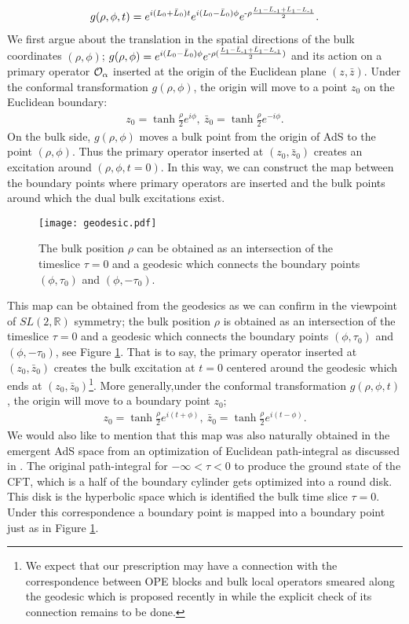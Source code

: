 \documentclass[11pt,a4paper]{article}
\def\a{{\alpha}}
\def\CO{{\cal O}}
\def\ba{\begin{eqnarray}}
\def\ea{\end{eqnarray}}
\def\f {\frac}
\def\z{\bar{z}}
\begin{document}
\ba
g(\rho,\phi,t)=%
e^{i(L_0+\bar{L}_0)t}e^{i(L_0-\bar{L}_0)\phi}e^{\mathchar`-
\rho\frac{L_{1}-\bar{L}_{\mathchar`-1}+\bar{L}_{1}-L_{\mathchar`-1}}{2}}.
\label{slgl}
\ea
We first argue about the translation in the spatial directions of the bulk coordinates $(\rho,\phi)$; $g(\rho,\phi)=%
e^{i(L_0-\bar{L}_0)\phi}e^{\mathchar`-
\rho(\frac{L_{1}-\bar{L}_{\mathchar`-1}+\bar{L}_{1}-L_{\mathchar`-1}}{2})}$ and its action on a primary operator $\CO_\a$ inserted at the origin of the Euclidean plane $(z,\z)$.
Under the conformal transformation $g(\rho,\phi)$, the origin will move to a point $z_0$ on the Euclidean boundary:
\ba
z_{0}=\tanh\f{\rho}{2}e^{i\phi},\ \z_{0}=\tanh\f{\rho}{2}e^{-i\phi}.\label{map0}
\ea
On the bulk side, $g(\rho,\phi)$ moves a bulk point from the origin of AdS to the point $(\rho,\phi)$. Thus the primary operator inserted at $(z_0,\z_0)$ creates an excitation around $(\rho,\phi,t=0)$. In this way, we can construct the map between the boundary points where primary operators are inserted and the bulk points around which the dual bulk excitations exist.
\begin{figure}
\begin{center}
  \texttt{[image: geodesic.pdf]}
  \caption{The bulk position $\rho$ can be obtained as an intersection of the timeslice $\tau=0$ and a geodesic which connects the boundary points $(\phi,\tau_0)$ and $(\phi,-\tau_0)$.}
  \label{geodesic3}
 \end{center}
\end{figure}
This map can be obtained from the geodesics as we can confirm in the viewpoint of $SL(2,\mathbb{R})$ symmetry;
the bulk position $\rho$ is obtained as an intersection of the timeslice $\tau=0$ and a geodesic which connects the boundary points $(\phi,\tau_0)$ and $(\phi,-\tau_0)$, see Figure \ref{geodesic3}. That is to say, the primary operator inserted at $(z_0,\z_0)$ creates the bulk excitation at $t=0$ centered around the geodesic which ends at $(z_0,\z_0)$\footnote{We expect that our prescription may have a connection with the correspondence between OPE blocks and bulk local operators smeared along the geodesic which is  proposed recently in \cite{CLMMS} while the explicit check of its connection remains to be done.}.
More generally,under the conformal transformation $g(\rho,\phi,t)$, the origin will move to a boundary point $z_0$;
\ba
z_{0}=\tanh\f{\rho}{2}e^{i(t+\phi)},\ \z_{0}=\tanh\f{\rho}{2}e^{i(t-\phi)}.\label{map}
\ea
 We would also like to mention that this map was also naturally obtained in the emergent AdS space from an optimization of Euclidean path-integral as discussed in \cite{OPT}. The original path-integral for $-\infty<\tau<0$ to produce the ground state of the CFT, which is a half of the boundary cylinder gets optimized into a round disk. This disk is the hyperbolic space which is identified the bulk time slice $\tau=0$. Under this correspondence a boundary point is mapped into a boundary point just as in Figure \ref{geodesic3}.
 
\end{document}
